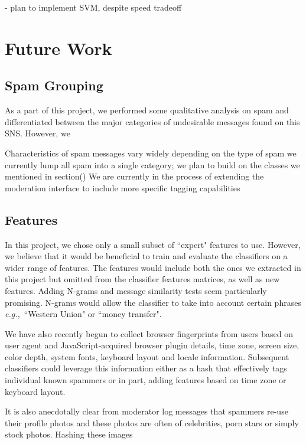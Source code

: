 \documentclass[preprint]{acm_proc_article-sp}
\newcommand{\eg}{{\em e.g.,}~}
\begin{document}
- plan to implement SVM, despite speed tradeoff 

\section{Future Work}

\subsection{Spam Grouping}

As a part of this project, we performed some qualitative analysis on spam and differentiated between the major categories of undesirable messages found on this SNS. However, we 

Characteristics of spam messages vary widely depending on the type of spam
we currently lump all spam into a single category; we plan to build on the classes we mentioned in section()
We are currently in the process of extending the moderation interface to include more specific tagging capabilities


\subsection{Features}

In this project, we chose only a small subset of ``expert" features to use. However, we believe that it would be beneficial to train and evaluate the classifiers on a wider range of features. The features would include both the ones we extracted in this project but omitted from the classifier features matrices, as well as new features. Adding N-grams and message similarity tests seem particularly promising. N-grams would allow the classifier to take into account certain phrases \eg{``Western Union" or ``money transfer"}. 

We have also recently begun to collect browser fingerprints from users based on user agent and JavaScript-acquired browser plugin details, time zone, screen size, color depth, system fonts, keyboard layout and locale information. Subsequent classifiers could leverage this information either as a hash that effectively tags individual known spammers or in part, adding features based on time zone or keyboard layout.

It is also anecdotally clear from moderator log messages that spammers re-use their profile photos and these photos are often of celebrities, porn stars or simply stock photos. Hashing these images 
\end{document}
